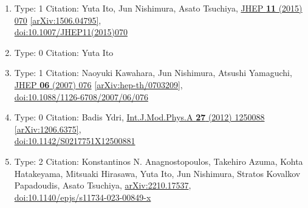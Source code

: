 \documentclass[a4paper,10pt]{article}
\begin{document}
\begin{enumerate}
\begin{enumerate}
  \item Type: 1 Citation: Yuta Ito, Jun Nishimura, Asato Tsuchiya, \href{https://www.doi.org/10.1007/JHEP11(2015)070}{JHEP {\bf 11} (2015) 070}  \href{https://arxiv.org/abs/1506.04795}{[arXiv:1506.04795]},\\\href{https://www.doi.org/10.1007/JHEP11(2015)070}{doi:10.1007/JHEP11(2015)070}
  \item Type: 0 Citation: Yuta Ito
  \item Type: 1 Citation: Naoyuki Kawahara, Jun Nishimura, Atsushi Yamaguchi, \href{https://www.doi.org/10.1088/1126-6708/2007/06/076}{JHEP {\bf 06} (2007) 076}  \href{https://arxiv.org/abs/hep-th/0703209}{[arXiv:hep-th/0703209]},\\\href{https://www.doi.org/10.1088/1126-6708/2007/06/076}{doi:10.1088/1126-6708/2007/06/076}
  \item Type: 0 Citation: Badis Ydri, \href{https://www.doi.org/10.1142/S0217751X12500881}{Int.J.Mod.Phys.A {\bf 27} (2012) 1250088}  \href{https://arxiv.org/abs/1206.6375}{[arXiv:1206.6375]},\\\href{https://www.doi.org/10.1142/S0217751X12500881}{doi:10.1142/S0217751X12500881}
  \item Type: 2 Citation: Konstantinos N. Anagnostopoulos, Takehiro Azuma, Kohta Hatakeyama, Mitsuaki Hirasawa, Yuta Ito, Jun Nishimura, Stratos Kovalkov Papadoudis, Asato Tsuchiya, \href{https://arxiv.org/abs/2210.17537}{arXiv:2210.17537},\\\href{https://www.doi.org/10.1140/epjs/s11734-023-00849-x}{doi:10.1140/epjs/s11734-023-00849-x}

\end{enumerate}
\end{enumerate}
\end{document}
